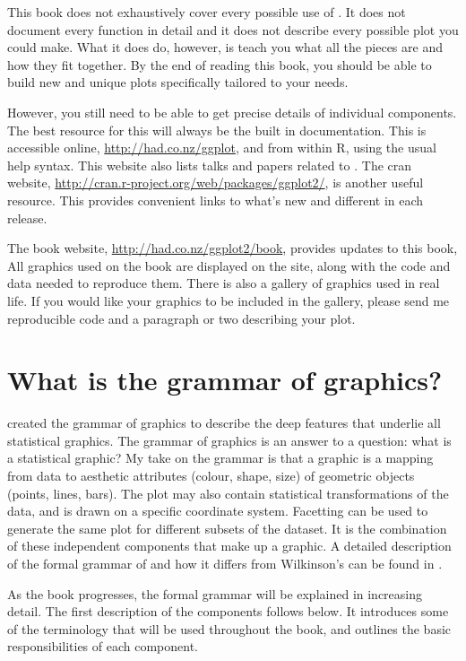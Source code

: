 This book does not exhaustively cover every possible use of \ggplot.  It does not document every function in detail and it does not describe every possible plot you could make.  What it does do, however, is teach you what all the pieces are and how they fit together.  By the end of reading this book, you should be able to build new and unique plots specifically tailored to your needs.  

However, you still need to be able to get precise details of individual components.  The best resource for this will always be the built in documentation.  This is accessible online, \url{http://had.co.nz/ggplot}, and from within R, using the usual help syntax. This website also lists talks and papers related to \ggplot.  The {\sc cran} website, \url{http://cran.r-project.org/web/packages/ggplot2/}, is another useful resource.  This provides convenient links to what's new and different in each release.

The book website, \url{http://had.co.nz/ggplot2/book}, provides updates to this book,   All graphics used on the book are displayed on the site, along with the code and data needed to reproduce them.  There is also a gallery of \ggplot graphics used in real life.  If you would like your graphics to be included in the gallery, please send me reproducible code and a paragraph or two describing your plot.


\section{What is the grammar of graphics?}

\citet{wilkinson:2006} created the grammar of graphics to describe the deep features that underlie all statistical graphics.  The grammar of graphics is an answer to a question: what is a statistical graphic?  My take on the grammar is that a graphic is a mapping from data to  aesthetic attributes (colour, shape, size) of geometric objects (points, lines, bars).  The plot may also contain statistical transformations of the data, and is drawn on a specific  coordinate system.  Facetting can be used to generate the same plot for different subsets of the dataset.  It is the combination of these independent components that make up a graphic.  A detailed description of the formal grammar of \ggplot and how it differs from Wilkinson's can be found in \citet{wickham:2007d}.

As the book progresses, the formal grammar will be explained in increasing detail.  The first description of the components follows below.  It introduces some of the terminology that will be used throughout the book, and outlines the basic responsibilities of each component.  

